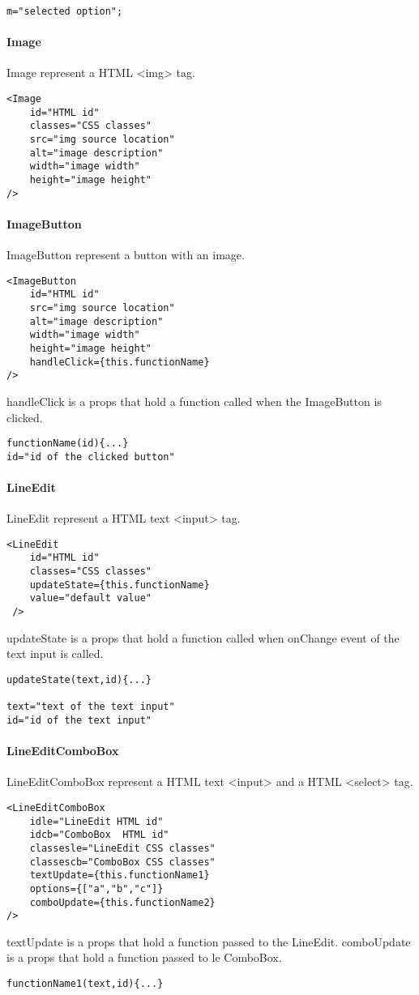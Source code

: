 \begin{flushleft}
\begin{verbatim}
m="selected option";
\end{verbatim}

    \paragraph{Image}
Image represent a HTML <img> tag.

\begin{verbatim}
<Image
    id="HTML id"
    classes="CSS classes"
    src="img source location"
    alt="image description"
    width="image width"
    height="image height"
/>
\end{verbatim}

    \paragraph{ImageButton}
ImageButton represent a button with an image.
\begin{verbatim}
<ImageButton
    id="HTML id"
    src="img source location"
    alt="image description"
    width="image width"
    height="image height"
    handleClick={this.functionName}
/>
\end{verbatim}
handleClick is a props that hold a function called when the ImageButton is clicked.
\begin{verbatim}
functionName(id){...}
id="id of the clicked button"
\end{verbatim}
    \paragraph{LineEdit}
LineEdit represent a HTML text <input> tag.
\begin{verbatim}
<LineEdit
    id="HTML id"
    classes="CSS classes"
    updateState={this.functionName}
    value="default value"
 />
\end{verbatim}
updateState is a props that hold a function called when onChange event of the text input is called.
\begin{verbatim}
updateState(text,id){...}

text="text of the text input"
id="id of the text input"
\end{verbatim}

    \paragraph{LineEditComboBox}
LineEditComboBox represent a HTML text <input> and a HTML <select> tag.
\begin{verbatim}
<LineEditComboBox
    idle="LineEdit HTML id"
    idcb="ComboBox  HTML id"
    classesle="LineEdit CSS classes"
    classescb="ComboBox CSS classes"
    textUpdate={this.functionName1}
    options={["a","b","c"]}
    comboUpdate={this.functionName2}
/>
\end{verbatim}
textUpdate is a props that hold a function passed to the LineEdit.
comboUpdate is a props that hold a function passed to le ComboBox.
\begin{verbatim}
functionName1(text,id){...}


\end{verbatim}
\end{flushleft}
